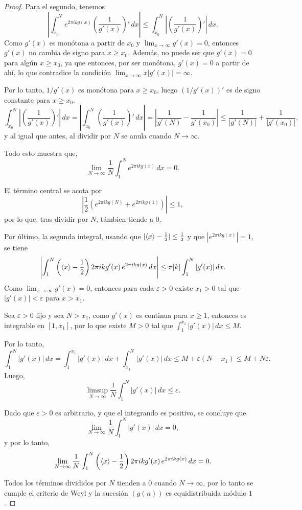 \begin{proof}
    Para el segundo, tenemos
    \[
        \left|\int_{x_0}^N e^{2\pi i k g(x)}\left(\frac{1}{g'(x)}\right)' \, dx\right|
        \leq \int_{x_0}^N \left|\left(\frac{1}{g'(x)}\right)'\right| \, dx.
    \]
    Como $g'(x)$ es monótona a partir de $x_0$ y $\lim_{x \to \infty} g'(x) = 0$, 
    entonces $g'(x)$ no cambia de signo para $x \geq x_0$. Además, no puede ser que 
    $g'(x) = 0$ para algún $x \geq x_0$, ya que entonces, por ser monótona, $g'(x) = 0$ 
    a partir de ahí, lo que contradice la condición $\lim_{x \to \infty} x|g'(x)| = \infty$.
    
    Por lo tanto, $1/g'(x)$ es monótona para $x \geq x_0$, luego $(1/g'(x))'$ es de 
    signo constante para $x \geq x_0$. 
    \[
        \int_{x_0}^N \left|\left(\frac{1}{g'(x)}\right)'\right| \, dx =
        \left|\int_{x_0}^N \left(\frac{1}{g'(x)}\right)' \, dx\right| =
        \left|\frac{1}{g'(N)} - \frac{1}{g'(x_0)} \right| \leq 
        \frac{1}{|g'(N)|} + \frac{1}{|g'(x_0)|},
    \]
    y al igual que antes, al dividir por $N$ se anula cuando $N \to \infty$.

    Todo esto muestra que,
    \[
        \lim_{N \to \infty} \frac{1}{N} \int_1^N e^{2\pi i k g(x)} \, dx = 0.
    \]

    El término central se acota por
    \[
        \left|\frac{1}{2} \left(e^{2\pi i k g(N)} + e^{2\pi i k g(1)}\right)\right| \leq 1,
    \]
    por lo que, tras dividir por $N$, támbien tiende a $0$.

    Por último, la segunda integral, usando que $|\langle x \rangle - \frac{1}{2}| \leq \frac{1}{2}$
    y que $|e^{2\pi i k g(x)}| = 1$, se tiene
    \[
        \left|\int_1^N \left(\langle x \rangle - \frac{1}{2}\right) 2\pi i k g'(x) \, e^{2\pi i k g(x)} \, dx\right|
        \leq \pi |k| \int_1^N  |g'(x)| \, dx.
    \]
    Como $\lim_{x \to \infty} g'(x) = 0$, entonces para cada $\varepsilon > 0$ 
    existe $x_1 > 0$ tal que $|g'(x)| < \varepsilon$ para $x > x_1$. 

    Sea $\varepsilon > 0$ fijo y sea $N > x_1$, como $g'(x)$ es continua para $x \geq 1$, entonces
    es integrable en $[1,x_1]$, por lo que existe $M > 0$ tal que $\int_1^{x_1} |g'(x)| \, dx \leq M$.

    Por lo tanto,
    \[
        \int_1^N |g'(x)| \, dx = 
        \int_1^{x_1} |g'(x)| \, dx + \int_{x_1}^N |g'(x)| \, dx \leq 
        M + \varepsilon (N - x_1) \leq
        M + N \varepsilon.
    \]
    Luego,
    \[
        \limsup_{N \to \infty} \frac{1}{N} \int_1^N |g'(x)| \, dx \leq \varepsilon.
    \]

    Dado que $\varepsilon > 0$ es arbitrario, y que el integrando es positivo, se concluye que
    \[
        \lim_{N \to \infty} \frac{1}{N} \int_1^N |g'(x)| \, dx = 0,
    \]
    y por lo tanto,
    \[
        \lim_{N \to \infty} \frac{1}{N} \int_1^N \left(\langle x \rangle - \frac{1}{2}\right) 2\pi i k g'(x) \, e^{2\pi i k g(x)} \, dx = 0.
    \]

    Todos los términos divididos por $N$ tienden a $0$ cuando $N \to \infty$, por lo tanto se cumple el 
    criterio de Weyl y la sucesión $(g(n))$ es equidistribuida módulo $1$.
\end{proof}
